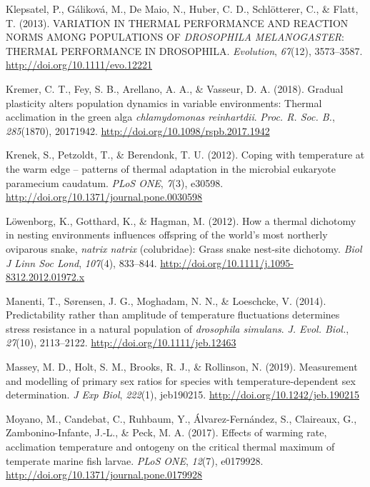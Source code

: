 \documentclass[12pt,twoside]{reedthesis}
\begin{document}
\leavevmode\hypertarget{ref-klepsatel_variation_2013}{}%
Klepsatel, P., Gáliková, M., De Maio, N., Huber, C. D., Schlötterer, C., \& Flatt, T. (2013). VARIATION IN THERMAL PERFORMANCE AND REACTION NORMS AMONG POPULATIONS OF \emph{DROSOPHILA MELANOGASTER}: THERMAL PERFORMANCE IN DROSOPHILA. \emph{Evolution}, \emph{67}(12), 3573--3587. \url{http://doi.org/10.1111/evo.12221}

\leavevmode\hypertarget{ref-kremer_gradual_2018}{}%
Kremer, C. T., Fey, S. B., Arellano, A. A., \& Vasseur, D. A. (2018). Gradual plasticity alters population dynamics in variable environments: Thermal acclimation in the green alga \emph{chlamydomonas reinhartdii}. \emph{Proc. R. Soc. B.}, \emph{285}(1870), 20171942. \url{http://doi.org/10.1098/rspb.2017.1942}

\leavevmode\hypertarget{ref-krenek_coping_2012}{}%
Krenek, S., Petzoldt, T., \& Berendonk, T. U. (2012). Coping with temperature at the warm edge -- patterns of thermal adaptation in the microbial eukaryote paramecium caudatum. \emph{PLoS ONE}, \emph{7}(3), e30598. \url{http://doi.org/10.1371/journal.pone.0030598}

\leavevmode\hypertarget{ref-lowenborg_how_2012}{}%
Löwenborg, K., Gotthard, K., \& Hagman, M. (2012). How a thermal dichotomy in nesting environments influences offspring of the world's most northerly oviparous snake, \emph{natrix natrix} (colubridae): Grass snake nest-site dichotomy. \emph{Biol J Linn Soc Lond}, \emph{107}(4), 833--844. \url{http://doi.org/10.1111/j.1095-8312.2012.01972.x}

\leavevmode\hypertarget{ref-manenti_predictability_2014-2}{}%
Manenti, T., Sørensen, J. G., Moghadam, N. N., \& Loeschcke, V. (2014). Predictability rather than amplitude of temperature fluctuations determines stress resistance in a natural population of \emph{drosophila simulans}. \emph{J. Evol. Biol.}, \emph{27}(10), 2113--2122. \url{http://doi.org/10.1111/jeb.12463}

\leavevmode\hypertarget{ref-massey_measurement_2019}{}%
Massey, M. D., Holt, S. M., Brooks, R. J., \& Rollinson, N. (2019). Measurement and modelling of primary sex ratios for species with temperature-dependent sex determination. \emph{J Exp Biol}, \emph{222}(1), jeb190215. \url{http://doi.org/10.1242/jeb.190215}

\leavevmode\hypertarget{ref-moyano_effects_2017}{}%
Moyano, M., Candebat, C., Ruhbaum, Y., Álvarez-Fernández, S., Claireaux, G., Zambonino-Infante, J.-L., \& Peck, M. A. (2017). Effects of warming rate, acclimation temperature and ontogeny on the critical thermal maximum of temperate marine fish larvae. \emph{PLoS ONE}, \emph{12}(7), e0179928. \url{http://doi.org/10.1371/journal.pone.0179928}
\end{document}
